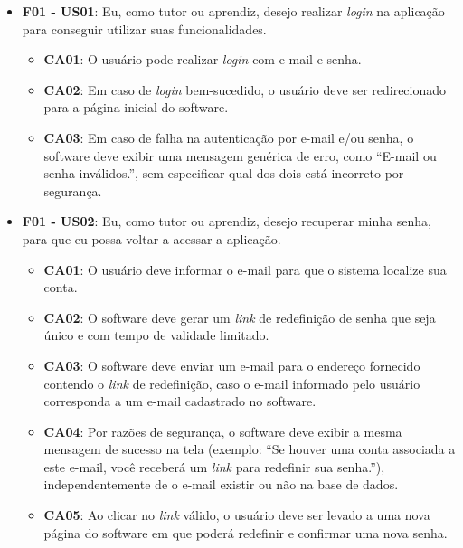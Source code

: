 \begin{itemize}

\item \textbf{F01 - US01}: Eu, como tutor ou aprendiz, desejo realizar \textit{login} na aplicação para conseguir utilizar suas funcionalidades.

\begin{itemize}

\item \textbf{CA01}: O usuário pode realizar \textit{login} com e-mail e senha.

\item \textbf{CA02}: Em caso de \textit{login} bem-sucedido, o usuário deve ser redirecionado para a página inicial do software.

\item \textbf{CA03}: Em caso de falha na autenticação por e-mail e/ou senha, o software deve exibir uma mensagem genérica de erro, como ``E-mail ou senha inválidos.'', sem especificar qual dos dois está incorreto por segurança.

\end{itemize}

\item \textbf{F01 - US02}: Eu, como tutor ou aprendiz, desejo recuperar minha senha, para que eu possa voltar a acessar a aplicação.

\begin{itemize}

\item \textbf{CA01}: O usuário deve informar o e-mail para que o sistema localize sua conta.

\item \textbf{CA02}: O software deve gerar um \textit{link} de redefinição de senha que seja único e com tempo de validade limitado.

\item \textbf{CA03}: O software deve enviar um e-mail para o endereço fornecido contendo o \textit{link} de redefinição, caso o e-mail informado pelo usuário corresponda a um e-mail cadastrado no software.
\label{ca03-us02}

\item \textbf{CA04}: Por razões de segurança, o software deve exibir a mesma mensagem de sucesso na tela (exemplo: ``Se houver uma conta associada a este e-mail, você receberá um \textit{link} para redefinir sua senha.''), independentemente de o e-mail existir ou não na base de dados.

\item \textbf{CA05}: Ao clicar no \textit{link} válido, o usuário deve ser levado a uma nova página do software em que poderá redefinir e confirmar uma nova senha.


\end{itemize}
\end{itemize}
